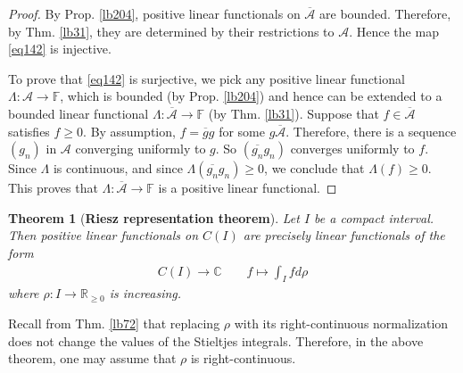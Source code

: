 \documentclass[12pt,b5paper,notitlepage]{article}
\theoremstyle{definition}
\theoremstyle{plain}
\newtheorem{thm}[df]{Theorem}
\newcommand{\ovl}{\overline}
\newcommand{\scr}{\mathscr}
\newcommand{\Cbb}{\mathbb C}
\newcommand{\Rbb}{\mathbb R}
\newcommand{\Fbb}{\mathbb F}
\numberwithin{equation}{section}
\begin{document}
\begin{proof}
By Prop. \ref{lb204}, positive linear functionals on $\ovl{\scr A}$ are bounded. Therefore, by Thm. \ref{lb31}, they are determined by their restrictions to $\scr A$. Hence the map \eqref{eq142} is injective.

To prove that \eqref{eq142} is surjective, we pick any positive linear functional $\Lambda:\scr A\rightarrow\Fbb$, which is bounded (by Prop. \ref{lb204}) and hence can be extended to a bounded linear functional $\Lambda:\ovl{\scr A}\rightarrow\Fbb$ (by Thm. \ref{lb31}). Suppose that $f\in\ovl{\scr A}$ satisfies $f\geq0$. By assumption, $f=\ovl gg$ for some $g\ovl{\scr A}$. Therefore, there is a sequence $(g_n)$ in $\scr A$ converging uniformly to $g$. So $(\ovl{g_n}g_n)$ converges uniformly to $f$. Since $\Lambda$ is continuous, and since $\Lambda(\ovl{g_n}g_n)\geq0$, we conclude that $\Lambda(f)\geq0$. This proves that $\Lambda:\ovl{\scr A}\rightarrow\Fbb$ is a positive linear functional.
\end{proof}




\begin{thm}[\textbf{Riesz representation theorem}]\label{lb206}
Let $I$ be a compact interval. Then positive linear functionals on $C(I)$ are precisely linear functionals of the form
\begin{align*}
C(I)\rightarrow\Cbb\qquad f\mapsto \int_Ifd\rho
\end{align*}
where $\rho:I\rightarrow\Rbb_{\geq0}$ is increasing.
\end{thm}

Recall from Thm. \ref{lb72} that replacing $\rho$ with its right-continuous normalization does not change the values of the Stieltjes integrals. Therefore, in the above theorem, one may assume that $\rho$ is right-continuous.
\end{document}
